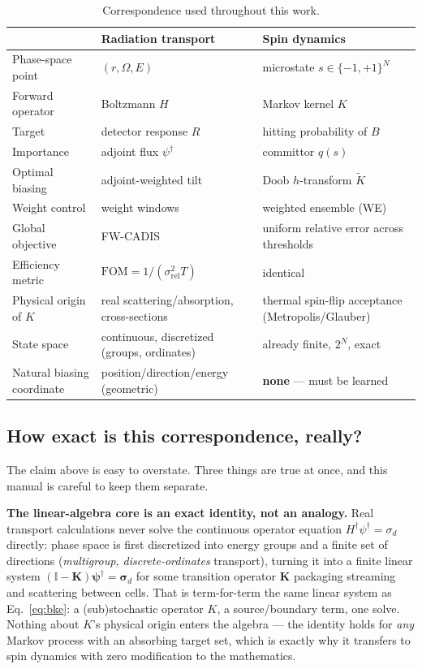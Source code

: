 \documentclass[11pt,a4paper]{article}
\begin{document}
\begin{table}[H]\centering\small
\caption{Correspondence used throughout this work.}
\begin{tabular}{p{3.0cm}p{6.0cm}p{6.0cm}}\toprule
& \textbf{Radiation transport} & \textbf{Spin dynamics}\\\midrule
Phase-space point & $(r,\Omega,E)$ & microstate $s\in\{-1,+1\}^N$\\
Forward operator & Boltzmann $H$ & Markov kernel $K$\\
Target & detector response $R$ & hitting probability of $B$\\
Importance & adjoint flux $\psi^\dagger$ & committor $q(s)$\\
Optimal biasing & adjoint-weighted tilt & Doob $h$-transform $\widetilde K$\\
Weight control & weight windows & weighted ensemble (WE)\\
Global objective & FW-CADIS & uniform relative error across thresholds\\
Efficiency metric & $\mathrm{FOM}=1/(\sigma^2_{\mathrm{rel}}T)$ & identical\\\midrule
Physical origin of $K$ & real scattering/absorption, cross-sections & thermal spin-flip
acceptance (Metropolis/Glauber)\\
State space & continuous, discretized (groups, ordinates) & already finite, $2^N$, exact\\
Natural biasing coordinate & position/direction/energy (geometric) & \textbf{none} --- must be
learned\\
\bottomrule\end{tabular}
\end{table}

\subsection{How exact is this correspondence, really?}
The claim above is easy to overstate. Three things are true at once, and this manual is careful
to keep them separate.

\textbf{The linear-algebra core is an exact identity, not an analogy.} Real transport
calculations never solve the continuous operator equation $H^\dagger\psi^\dagger=\sigma_d$
directly: phase space is first discretized into energy groups and a finite set of directions
(\emph{multigroup, discrete-ordinates} transport), turning it into a finite linear system
$(\mathbb I-\mathbf K)\boldsymbol\psi^\dagger=\boldsymbol\sigma_d$ for some transition operator
$\mathbf K$ packaging streaming and scattering between cells. That is term-for-term the same
linear system as Eq.~\eqref{eq:bke}: a (sub)stochastic operator $K$, a source/boundary term, one
solve. Nothing about $K$'s physical origin enters the algebra --- the identity holds for
\emph{any} Markov process with an absorbing target set, which is exactly why it transfers to
spin dynamics with zero modification to the mathematics.
\end{document}
